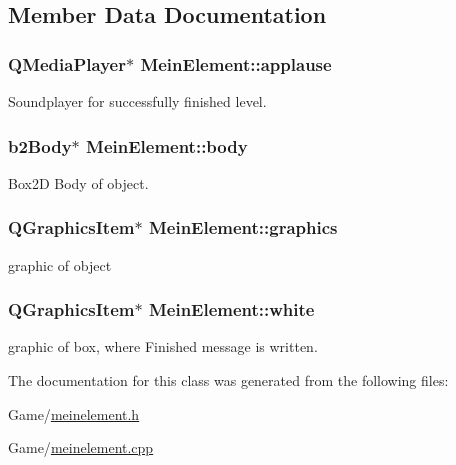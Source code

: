 \subsection{Member Data Documentation}
\subsubsection[{\texorpdfstring{applause}{applause}}]{\setlength{\rightskip}{0pt plus 5cm}Q\+Media\+Player$\ast$ Mein\+Element\+::applause}\hypertarget{class_mein_element_a04019be8ecb452cf4ee984efed24e9e1}{}\label{class_mein_element_a04019be8ecb452cf4ee984efed24e9e1}


Soundplayer for successfully finished level. 

\subsubsection[{\texorpdfstring{body}{body}}]{\setlength{\rightskip}{0pt plus 5cm}b2\+Body$\ast$ Mein\+Element\+::body}\hypertarget{class_mein_element_a05117e05589fc0a4b1e144511fbd3eec}{}\label{class_mein_element_a05117e05589fc0a4b1e144511fbd3eec}


Box2D Body of object. 

\subsubsection[{\texorpdfstring{graphics}{graphics}}]{\setlength{\rightskip}{0pt plus 5cm}Q\+Graphics\+Item$\ast$ Mein\+Element\+::graphics}\hypertarget{class_mein_element_a6d0a318f2e37f3633f7cf6fc20e83531}{}\label{class_mein_element_a6d0a318f2e37f3633f7cf6fc20e83531}


graphic of object 

\subsubsection[{\texorpdfstring{white}{white}}]{\setlength{\rightskip}{0pt plus 5cm}Q\+Graphics\+Item$\ast$ Mein\+Element\+::white}\hypertarget{class_mein_element_a4811ea6a6c50dfad16c39bbaa9a758b8}{}\label{class_mein_element_a4811ea6a6c50dfad16c39bbaa9a758b8}


graphic of box, where \textquotesingle{}Finished\textquotesingle{} message is written. 



The documentation for this class was generated from the following files\+:\begin{DoxyCompactItemize}
\item 
Game/\hyperlink{meinelement_8h}{meinelement.\+h}\item 
Game/\hyperlink{meinelement_8cpp}{meinelement.\+cpp}\end{DoxyCompactItemize}
